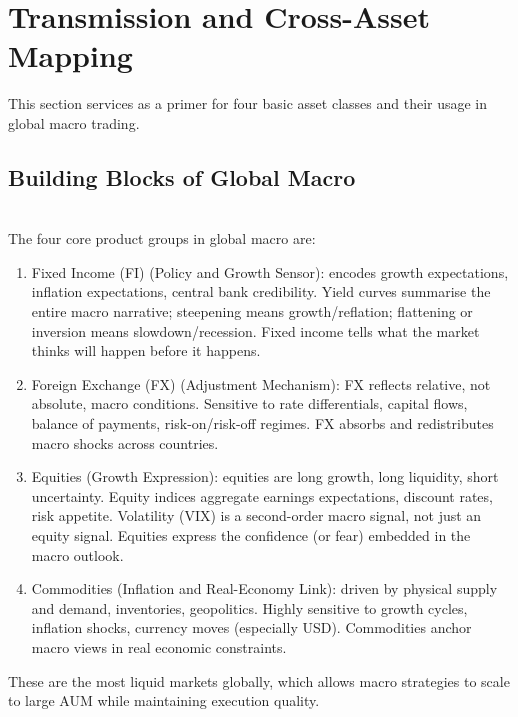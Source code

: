 \section{Transmission and Cross-Asset Mapping}

This section services as a primer for four basic asset classes and their usage in global macro trading.

\subsection{Building Blocks of Global Macro}

\begin{remark} \\
The four core product groups in global macro are:
\begin{enumerate}[label=\roman*.]
\setlength{\itemsep}{0pt}
\item Fixed Income (FI) (Policy and Growth Sensor): encodes growth expectations, inflation expectations, central bank credibility. Yield curves summarise the entire macro narrative; steepening means growth/reflation; flattening or inversion means slowdown/recession. Fixed income tells what the market thinks will happen before it happens.
\item Foreign Exchange (FX) (Adjustment Mechanism): FX reflects relative, not absolute, macro conditions. Sensitive to rate differentials, capital flows, balance of payments, risk-on/risk-off regimes. FX absorbs and redistributes macro shocks across countries.
\item Equities (Growth Expression): equities are long growth, long liquidity, short uncertainty. Equity indices aggregate earnings expectations, discount rates, risk appetite. Volatility (VIX) is a second-order macro signal, not just an equity signal. Equities express the confidence (or fear) embedded in the macro outlook.
\item Commodities (Inflation and Real-Economy Link): driven by physical supply and demand, inventories, geopolitics. Highly sensitive to growth cycles, inflation shocks, currency moves (especially USD). Commodities anchor macro views in real economic constraints.
\end{enumerate}
These are the most liquid markets globally, which allows macro strategies to scale to large AUM while maintaining execution quality.
\end{remark}

